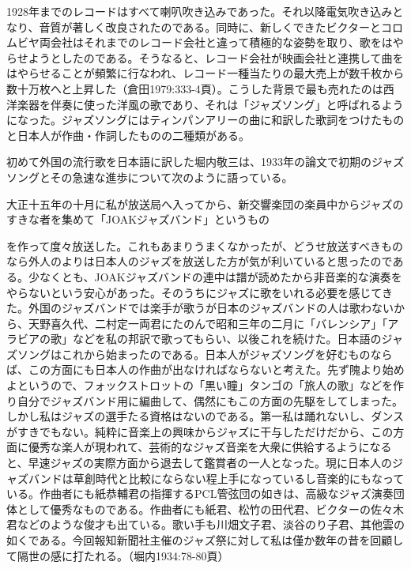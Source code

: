 1928年までのレコードはすべて喇叭吹き込みであった。それ以降電気吹き込みとなり、音質が著しく改良されたのである。同時に、新しくできたビクターとコロムビヤ両会社はそれまでのレコード会社と違って積極的な姿勢を取り、歌をはやらせようとしたのである。そうなると、レコード会社が映画会社と連携して曲をはやらせることが頻繁に行なわれ、レコード一種当たりの最大売上が数千枚から数十万枚へと上昇した（倉田1979:333-4頁）。こうした背景で最も売れたのは西洋楽器を伴奏に使った洋風の歌であり、それは「ジャズソング」と呼ばれるようになった。ジャズソングにはティンパンアリーの曲に和訳した歌詞をつけたものと日本人が作曲・作詞したものの二種類がある。

初めて外国の流行歌を日本語に訳した堀内敬三は、1933年の論文で初期のジャズソングとその急速な進歩について次のように語っている。

\begin{gquote}
大正十五年の十月に私が放送局へ入ってから、新交響楽団の楽員中からジャズのすきな者を集めて「JOAKジャズバンド」というもの
\end{gquote}

\begin{gquote}
を作って度々放送した。これもあまりうまくなかったが、どうせ放送すべきものなら外人のよりは日本人のジャズを放送した方が気が利いていると思ったのである。少なくとも、JOAKジャズバンドの連中は譜が読めたから非音楽的な演奏をやらないという安心があった。そのうちにジャズに歌をいれる必要を感じてきた。外国のジャズバンドでは楽手が歌うが日本のジャズバンドの人は歌わないから、天野喜久代、二村定一両君にたのんで昭和三年の二月に「バレンシア」「アラビアの歌」などを私の邦訳で歌ってもらい、以後これを続けた。日本語のジャズソングはこれから始まったのである。日本人がジャズソングを好むものならば、この方面にも日本人の作曲が出なければならないと考えた。先ず隗より始めよというので、フォックストロットの「黒い瞳」タンゴの「旅人の歌」などを作り自分でジャズバンド用に編曲して、偶然にもこの方面の先駆をしてしまった。しかし私はジャズの選手たる資格はないのである。第一私は踊れないし、ダンスがすきでもない。純粋に音楽上の興味からジャズに干与しただけだから、この方面に優秀な楽人が現われて、芸術的なジャズ音楽を大衆に供給するようになると、早速ジャズの実際方面から退去して鑑賞者の一人となった。現に日本人のジャズバンドは草創時代と比較にならない程上手になっているし音楽的にもなっている。作曲者にも紙恭輔君の指揮するPCL管弦団の如きは、高級なジャズ演奏団体として優秀なものである。作曲者にも紙君、松竹の田代君、ビクターの佐々木君などのような俊才も出ている。歌い手も川畑文子君、淡谷のり子君、其他雲の如くである。今回報知新聞社主催のジャズ祭に対して私は僅か数年の昔を回顧して隔世の感に打たれる。（堀内1934:78-80頁）
\end{gquote}

